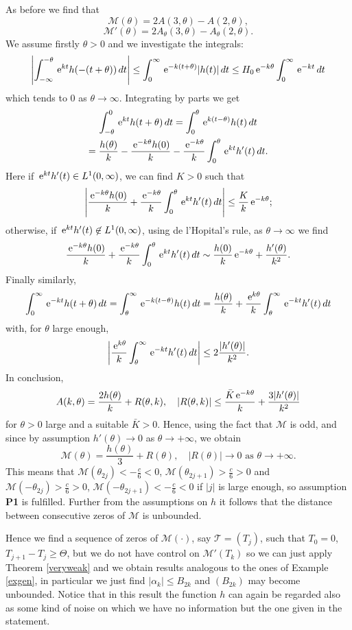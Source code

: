 \documentclass[10pt]{article}
\numberwithin{equation}{section}
\def\eu{ {\, \textrm{\rm e} }}
\def\al{\alpha}
\def\MM{{\mathcal M}}
\def\TT{{\mathcal T}}
\def\ogap{\Theta}   %
\def\aaa{\theta}
\newcommand\assump[1]{{\rm\textbf{#1}}}
\theoremstyle{definition}
\theoremstyle{remark}
\begin{document}
 As before we find  that
$$\mathcal{M}(\aaa)=2A(3,\aaa)-A(2,\aaa),$$
\begin{equation}\label{Mprimo}
  \mathcal{M}'(\aaa)=2A_\theta(3,\aaa)-A_\theta(2,\aaa).
\end{equation}
We assume firstly $\theta>0$ and we investigate the integrals:
$$\left|\int_{-\infty}^{-\aaa}\eu^{kt}h(-(t+\aaa))\,dt\right|	
\leq\int_0^\infty\eu^{-k(t+\aaa)}|h(t)|\,dt \leq H_0\eu^{-k\aaa}\int_0^\infty\eu^{-kt}\,dt$$
which tends to $0$ as $\aaa\to\infty$. Integrating by parts we get
\begin{gather*}
	\int_{-\aaa}^0\eu^{kt}h(t+\aaa)\,dt = \int_0^\aaa \eu^{k(t-\aaa)}h(t)\,dt\\
	=\frac{h(\aaa)}{k}-\frac{\eu^{-k\aaa}h(0)}{k}
	-\frac{\eu^{-k\aaa}}{k}\int_0^\aaa \eu^{kt}h'(t)\,dt.
\end{gather*}
Here if $  \eu^{kt}h'(t) \in L^1(0,\infty)$, we can find $K>0$ such that
$$\left|\frac{\eu^{-k\aaa}h(0)}{k}
	+ \frac{\eu^{-k\aaa}}{k}\int_0^\aaa \eu^{kt}h'(t)\,dt\right| \le \frac{K}{k} \eu^{-k\aaa};$$
otherwise, if $  \eu^{kt}h'(t) \not\in L^1(0,\infty)$, using de l'Hopital's rule, as $\aaa \to \infty$ we find
$$ \frac{\eu^{-k\aaa}h(0)}{k}
	+ \frac{\eu^{-k\aaa}}{k}\int_0^\aaa \eu^{kt}h'(t)\,dt  \sim \frac{h(0)}{k} \eu^{-k\aaa} + \frac{h'(\aaa)}{k^2}.$$
Finally similarly,
\begin{equation*}
	\int_0^\infty \eu^{-kt}h(t+\aaa)\,dt=\int_\aaa^\infty\eu^{-k(t-\aaa)}h(t)\,dt
	=\frac{h(\aaa)}{k}+\frac{\eu^{k\aaa}}{k}\int_\aaa^\infty\eu^{-kt}h'(t)\,dt	
\end{equation*}
with, for $\aaa$ large enough,  	
$$\left|\frac{\eu^{k\aaa}}{k}\int_\aaa^\infty\eu^{-kt}h'(t)\,dt\right|
\leq    2 \frac{|h'(\aaa)|}{k^2}.$$
In conclusion,
$$A(k,\aaa)=\frac{2h(\aaa)}{k}+R(\aaa,k),\quad |R(\aaa,k)|\leq   \frac{\bar{K} \eu^{-k \aaa}}{k} + \frac{3|h'(\aaa)|}{k^2}
 $$
for $\aaa>0$ large and a suitable $\bar{K}>0$.
Hence, using the fact that $\mathcal{M}$ is odd,
 and since by assumption $h'(\aaa) \to 0$ as $\aaa \to +\infty$,
 we obtain
$$\mathcal{M}(\aaa)=\frac{h(\aaa)}{3}+R(\aaa),\quad |R(\aaa)|\to 0 \text{ as $\aaa \to +\infty$}.$$
This means that $\mathcal{M}(\aaa_{2j})<-\tfrac{c}{6}<0$, $\mathcal{M}(\aaa_{2j+1})>\tfrac{c}{6}>0$ and
$\mathcal{M}(-\aaa_{2j})>\tfrac{c}{6}>0$, $\mathcal{M}(-\aaa_{2j+1})<-\tfrac{c}{6}<0$ if $|j|$ is large enough, so
assumption \assump{P1} is  fulfilled. Further from the assumptions on $h$ it follows that the distance between consecutive zeros of $\MM$ is
unbounded.

Hence we find a  sequence of zeros of   $\MM(\cdot)$, say $\TT=(T_j)$, such that $T_0=0$, $T_{j+1}-T_j \ge
\ogap$,
but we do not have control on $\MM'(T_k)$ so we can just apply Theorem \ref{veryweak}
and we obtain results analogous to the ones
of Example \ref{exgen}, in particular we just find $|\al_k| \le B_{2k}$ and $(B_{2k})$ may become unbounded.
Notice that in this result the function $h$ can again be regarded also as some kind of noise on which we have no information but the one given in
the statement.
\end{document}
